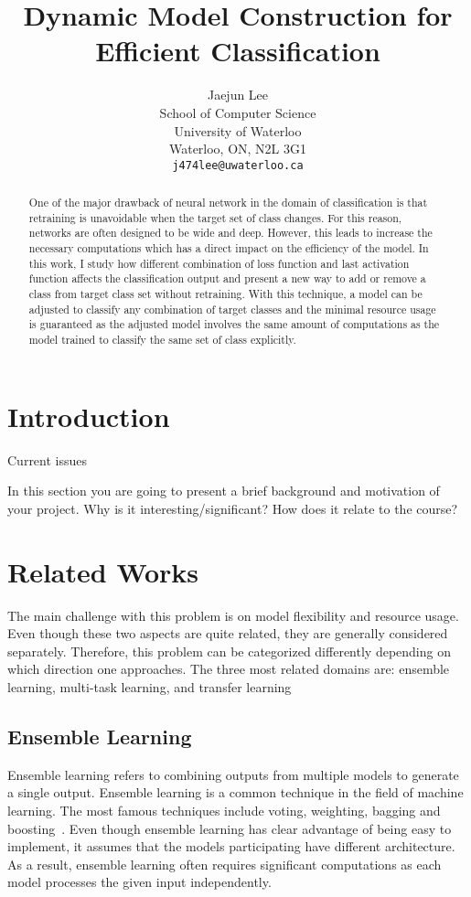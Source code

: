 \documentclass{article}
\title{Dynamic Model Construction for Efficient Classification}
\author{
	Jaejun Lee \\
	School of Computer Science\\
	University of Waterloo\\
	Waterloo, ON, N2L 3G1 \\
	\texttt{j474lee@uwaterloo.ca} \\
}
\begin{document}
\maketitle

\begin{abstract}

One of the major drawback of neural network in the domain of classification is that retraining is unavoidable when the target set of class changes. For this reason, networks are often designed to be wide and deep. However, this leads to increase the necessary computations which has a direct impact on the efficiency of the model. In this work, I study how different combination of loss function and last activation function affects the classification output and present a new way to add or remove a class from target class set without retraining. With this technique, a model can be adjusted to classify any combination of target classes and the minimal resource usage is guaranteed as the adjusted model involves the same amount of computations as the model trained to classify the same set of class explicitly.

\end{abstract}

\section{Introduction}

Current issues


In this section you are going to present a brief background and motivation of your project. Why is it interesting/significant? How does it relate to the course?

\section{Related Works}

The main challenge with this problem is on model flexibility and resource usage. Even though these two aspects are quite related, they are generally considered separately. Therefore, this problem can be categorized differently depending on which direction one approaches. The three most related domains are: ensemble learning, multi-task learning, and transfer learning

\subsection{Ensemble Learning}
Ensemble learning refers to combining outputs from multiple models to generate a single output. Ensemble learning is a common technique in the field of machine learning. The most famous techniques include voting, weighting, bagging and boosting~\cite{dietterich2000ensemble, breiman1996bagging, freund1996experiments}. Even though ensemble learning has clear advantage of being easy to implement, it assumes that the models participating have different architecture. As a result, ensemble learning often requires significant computations as each model processes the given input independently.
\end{document}
